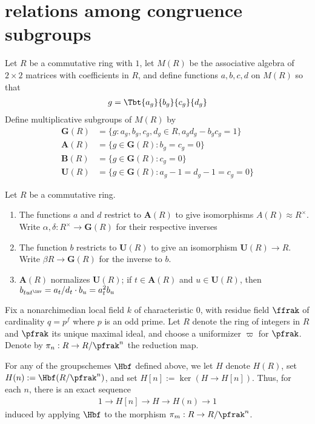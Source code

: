 \section{relations among congruence subgroups}

Let $R$ be a commutative ring with $1$, let $M(R)$ be the associative algebra of $2\times 2$ matrices with coefficients in $R$, and define functions $a,b,c,d$ on $M(R)$ so that
\begin{align*}
  g = \Tbt{a_g}{b_g}{c_g}{d_g}
\end{align*}
Define multiplicative subgroups of $M(R)$ by
\begin{align*}\label{groups}
  \mathbf{G}(R) & =\{g:a_g,b_g,c_g,d_g \in R, a_gd_g-b_gc_g=1 \} \\
  \mathbf{A}(R) & =\{g \in \mathbf{G}(R) : b_g=c_g = 0\}         \\
  \mathbf{B}(R) & =\{g\in \mathbf{G}(R) : c_g = 0\}              \\
  \mathbf{U}(R) & =\{g \in \mathbf{G}(R) : a_g-1=d_g-1=c_g = 0\}
\end{align*}
\begin{lemma}
  Let $R$ be a commutative ring.
  \begin{enumerate}
    \item The functions $a$ and $d$ restrict to $\mathbf{A}(R)$ to give isomorphisms $A(R) \approx R^\times$. Write $\alpha,\delta: R^\times \to \mathbf{G}(R)$ for their respective inverses
    \item The function $b$ restricts to $\mathbf{U}(R)$ to give an isomorphism $\mathbf{U}(R) \to R$. Write $\beta  R \to \mathbf{G}(R)$ for the inverse to $b$.
    \item $\mathbf{A}(R)$ normalizes $\mathbf{U}(R)$; if $t\in \mathbf{A}(R)$ and $u \in \mathbf{U}(R)$, then $b_{tut^\inv} = a_t/d_t \cdot b_u = a_t^2 b_u$
  \end{enumerate}
\end{lemma}


Fix a nonarchimedian local field $k$ of characteristic $0$, with residue field $\ffrak$ of cardinality $q= p^f$ where $p$ is an odd prime. Let $R$ denote the ring of integers in $R$ and $\pfrak$ its unique maximal ideal, and choose a uniformizer $\varpi$ for $\pfrak$. Denote by $\pi_n : R \to R/\pfrak^n$ the reduction map.

For any of the groupschemes $\Hbf$ defined above, we let $H$ denote $H(R)$, set $H(n):=\Hbf(R/\pfrak^n)$, and set $H[n]:= \ker \left( H \to H[n]\right)$. Thus, for each $n$, there is an exact sequence
\begin{align}
  1 \to H[n]\to H \to H(n) \to 1
\end{align}
induced by applying $\Hbf$ to the morphism $\pi_m : R \to R/\pfrak^n$.


